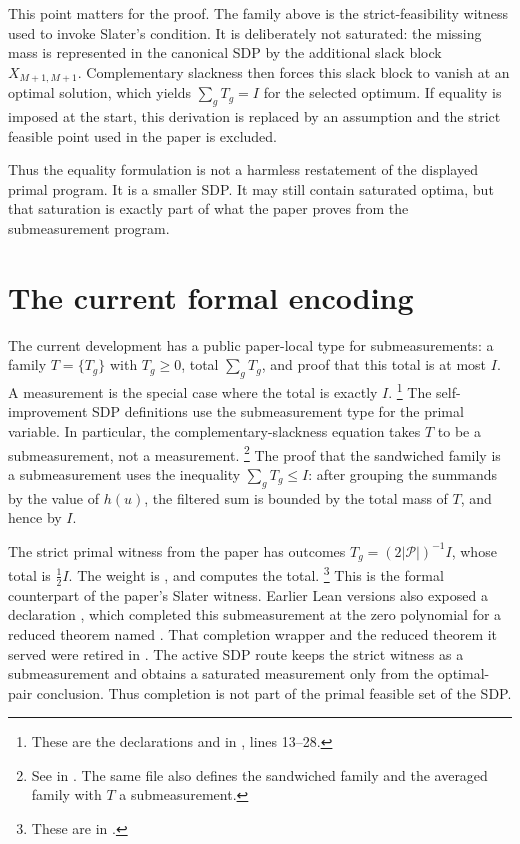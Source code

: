 \documentclass[11pt]{article}
\newcommand{\cP}{\mathcal P}
\begin{document}
This point matters for the proof. The family above is the strict-feasibility
witness used to invoke Slater's condition. It is deliberately not saturated:
the missing mass is represented in the canonical SDP by the additional slack
block $X_{M+1,M+1}$. Complementary slackness then forces this slack block to
vanish at an optimal solution, which yields $\sum_g T_g=I$ for the selected
optimum. If equality is imposed at the start, this derivation is replaced by an
assumption and the strict feasible point used in the paper is excluded.

Thus the equality formulation is not a harmless restatement of the displayed
primal program. It is a smaller SDP. It may still contain saturated optima, but
that saturation is exactly part of what the paper proves from the submeasurement
program.

\section{The current formal encoding}

The current development has a public paper-local type for submeasurements: a
family $T=\{T_g\}$ with $T_g\ge 0$, total
$\sum_g T_g$, and proof that this total is at most $I$. A measurement is the
special case where the total is exactly $I$.
\footnote{These are the declarations
 and  in
, lines 13--28.}
The self-improvement SDP definitions use the submeasurement type for the
primal variable. In particular, the complementary-slackness equation takes $T$
to be a submeasurement, not a measurement.
\footnote{See
 in
. The same file also defines the
sandwiched family  and the averaged family
 with $T$ a submeasurement.}
The proof that the sandwiched family is a submeasurement uses the inequality
$\sum_g T_g\le I$: after grouping the summands by the value of $h(u)$, the
filtered sum is bounded by the total mass of $T$, and hence by $I$.

The strict primal witness from the paper has outcomes $T_g=(2|\cP|)^{-1}I$,
whose total is $\frac12 I$.  The weight is
, and  computes
the total.
\footnote{These are in
.}
This is the formal counterpart of the paper's Slater witness. Earlier Lean
versions also exposed a declaration , which completed
this submeasurement at the zero polynomial for a reduced theorem named
.  That completion wrapper and the reduced theorem it served were
retired in .  The active SDP route keeps the strict witness as a
submeasurement and obtains a saturated measurement only from the optimal-pair
conclusion.  Thus completion is not part of the primal feasible set of the SDP.
\end{document}
